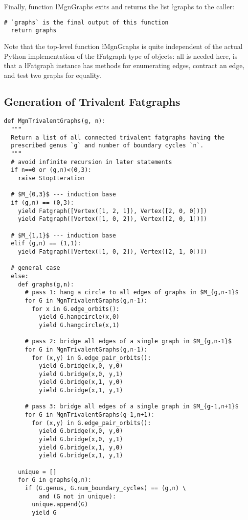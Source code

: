 Finally, function \l{MgnGraphs} exits and returns the list \l{graphs} to the
caller:
\begin{lstlisting}[name=MgnGraphs,firstnumber=21]
  # `graphs` is the final output of this function
  return graphs
\end{lstlisting}

Note that the top-level function \l{MgnGraphs} is quite independent of
the actual Python implementation of the \l{Fatgraph} type of objects:
all is needed here, is that a \l{Fatgraph} instance has methods for
enumerating edges, contract an edge, and test two graphs for equality.


\subsection{Generation of Trivalent Fatgraphs}
\label{sec:stage1-trivalent}

\begin{lstlisting}
def MgnTrivalentGraphs(g, n):
  """
  Return a list of all connected trivalent fatgraphs having the
  prescribed genus `g` and number of boundary cycles `n`.
  """
  # avoid infinite recursion in later statements
  if n==0 or (g,n)<(0,3):
    raise StopIteration

  # $M_{0,3}$ --- induction base
  if (g,n) == (0,3):
    yield Fatgraph([Vertex([1, 2, 1]), Vertex([2, 0, 0])])
    yield Fatgraph([Vertex([1, 0, 2]), Vertex([2, 0, 1])])

  # $M_{1,1}$ --- induction base
  elif (g,n) == (1,1):
    yield Fatgraph([Vertex([1, 0, 2]), Vertex([2, 1, 0])])

  # general case
  else:
    def graphs(g,n):
      # pass 1: hang a circle to all edges of graphs in $M_{g,n-1}$
      for G in MgnTrivalentGraphs(g,n-1):
        for x in G.edge_orbits():
          yield G.hangcircle(x,0)
          yield G.hangcircle(x,1)

      # pass 2: bridge all edges of a single graph in $M_{g,n-1}$
      for G in MgnTrivalentGraphs(g,n-1):
        for (x,y) in G.edge_pair_orbits():
          yield G.bridge(x,0, y,0)
          yield G.bridge(x,0, y,1)
          yield G.bridge(x,1, y,0)
          yield G.bridge(x,1, y,1)

      # pass 3: bridge all edges of a single graph in $M_{g-1,n+1}$
      for G in MgnTrivalentGraphs(g-1,n+1):
        for (x,y) in G.edge_pair_orbits():
          yield G.bridge(x,0, y,0)
          yield G.bridge(x,0, y,1)
          yield G.bridge(x,1, y,0)
          yield G.bridge(x,1, y,1)

    unique = []
    for G in graphs(g,n):
      if (G.genus, G.num_boundary_cycles) == (g,n) \
          and (G not in unique):
        unique.append(G)
        yield G
\end{lstlisting}



